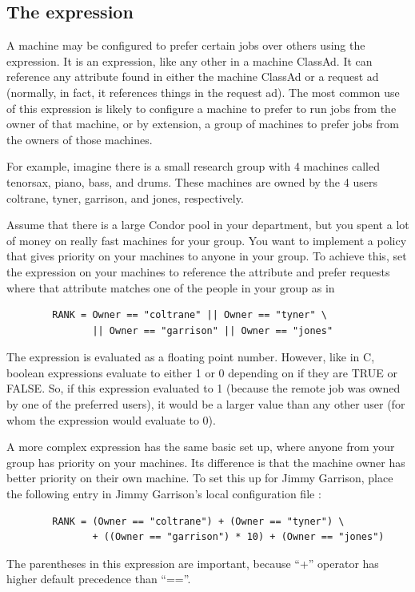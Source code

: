 \subsection{\label{sec:Rank-Expression}
The  expression}

A machine may be configured to prefer certain jobs over others
using the  expression.
It is an
expression, like any other in a machine ClassAd.
It can
reference any attribute found in either the machine ClassAd or a
request ad (normally, in fact, it references things in the request
ad).
The most common use of this expression is likely to configure a
machine to prefer to run jobs from the owner of that machine, or by
extension, a group of machines to prefer jobs from the owners of those
machines.

For example, imagine there is a small research group with 4 machines
called tenorsax, piano, bass, and drums.
These machines are owned by the 4 users
coltrane, tyner, garrison, and jones,
respectively.  

Assume that there is a large Condor pool in your department,
but you spent a lot of money on really fast machines for your group.
You want to implement a policy
that gives priority on your machines to
anyone in your group.
To achieve this, set the 
expression on your machines to reference the  attribute and
prefer requests where that attribute matches one of the people in your
group as in
\begin{verbatim}
        RANK = Owner == "coltrane" || Owner == "tyner" \
               || Owner == "garrison" || Owner == "jones"
\end{verbatim}

The  expression is evaluated as a floating point number.
However, like in C, boolean expressions evaluate to either 1 or 0
depending on if they are TRUE or FALSE.
So, if this expression
evaluated to 1 (because the remote job was owned by one of the 
preferred users), it would be a larger value than any other
user (for whom the expression would evaluate to 0).

A more complex  expression
has the same basic set up,
where anyone from your group has priority on your machines.
Its difference is that
the machine owner has better priority on their own machine.
To set this up for Jimmy Garrison,
place the following entry in Jimmy Garrison's local
configuration file :
\begin{verbatim}
        RANK = (Owner == "coltrane") + (Owner == "tyner") \
               + ((Owner == "garrison") * 10) + (Owner == "jones")
\end{verbatim}
\Note The parentheses in this expression are important, because ``+''
      operator has higher default precedence than ``==''.

